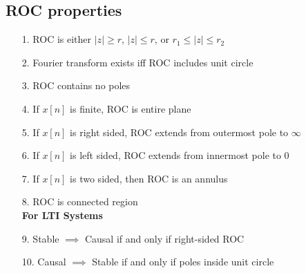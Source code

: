 \documentclass{article}
\begin{document}
\subsection*{ROC properties}
\begin{itemize}
    \item[1.] ROC is either $|z|\ge r$, $|z|\le r$, or $r_1 \le |z| \le r_2$
    \item[2.] Fourier transform exists iff ROC includes unit circle
    \item[3.] ROC contains no poles
    \item[4.] If $x[n]$ is finite, ROC is entire plane
    \item[5.] If $x[n]$ is right sided, ROC extends from outermost pole to $\infty$
    \item[6.] If $x[n]$ is left sided, ROC extends from innermost pole to 0
    \item[7.] If $x[n]$ is two sided, then ROC is an annulus
    \item[8.] ROC is connected region\\
    \textbf{For LTI Systems}
    \item[9.] Stable $\implies$ Causal if and only if right-sided ROC
    \item[10.] Causal $\implies$ Stable if and only if poles inside unit circle
\end{itemize}
\end{document}
